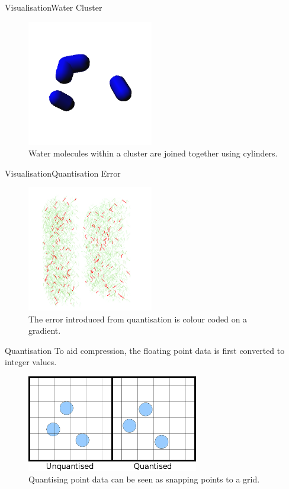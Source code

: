 \documentclass{beamer}
\begin{document}
\begin{frame}{Visualisation}{Water Cluster}
\begin{figure}
  \centering
  \includegraphics[width=55mm]{min-images/water-cluster.png}
  \caption{Water molecules within a cluster are joined together using cylinders.}
\end{figure}
\end{frame}

\begin{frame}{Visualisation}{Quantisation Error}
\begin{figure}
  \centering
  \includegraphics[width=55mm]{min-images/quantisation-error-line.png}
  \caption{The error introduced from quantisation is colour coded on a gradient.}
\end{figure}
\end{frame}

\begin{frame}{Quantisation}
To aid compression, the floating point data is first converted to integer values.

\begin{figure}
  \centering
  \includegraphics[width=75mm]{min-images/quantisation.png}
  \caption{Quantising point data can be seen as snapping points to a grid.}
\end{figure}
\end{frame}
\end{document}

